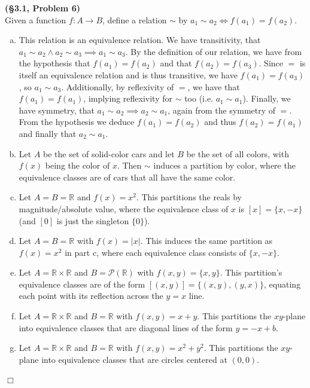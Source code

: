 \documentclass[12pt]{article}
\theoremstyle{definition}
\newenvironment{Solution}{\noindent {\sc Solution.}}{$\Box$ \vspace{2 ex}}
\begin{document}
\vspace{0.5cm}

\begin{Solution}
{\bf (\S3.1, Problem 6)}\\
Given a function $f : A \to B$, define a relation $\sim$ by $a_1 \sim a_2 \iff f(a_1) = f(a_2)$.
\begin{enumerate}[(a)]
    \item This relation is an equivalence relation. We have transitivity, that $a_1 \sim a_2 \land a_2 \sim a_3 \implies a_1\sim a_3$. By the definition of our relation, we have from the hypothesis that $f(a_1) = f(a_2)$ and that $f(a_2) = f(a_3)$. Since $=$ is itself an equivalence relation and is thus transitive, we have $f(a_1)=f(a_3)$, so $a_1 \sim a_3$. Additionally, by reflexivity of $=$, we have that $f(a_1) = f(a_1)$, implying reflexivity for $\sim$ too (i.e. $a_1 \sim a_1$). Finally, we have symmetry, that $a_1 \sim a_2 \implies a_2 \sim a_1$, again from the symmetry of $=$. From the hypothesis we deduce $f(a_1)=f(a_2)$ and thus $f(a_2) = f(a_1)$ and finally that $a_2 \sim a_1$.
    \item Let $A$ be the set of solid-color cars and let $B$ be the set of all colors, with $f(x)$ being the color of $x$. Then $\sim$ induces a partition by color, where the equivalence classes are of cars that all have the same color.
    \item Let $A=B=\mathbb R$ and $f(x)=x^2$. This partitions the reals by magnitude/absolute value, where the equivalence class of $x$ is $[x]=\{x,-x\}$ (and $[0]$ is just the singleton $\{0\}$).
    \item Let $A=B=\mathbb R$ with $f(x)=|x|$. This induces the same partition as $f(x)=x^2$ in part c, where each equivalence class consists of $\{x, -x\}$.
    \item Let $A=\mathbb R \times \mathbb R$ and $B=\mathcal P(\mathbb R)$ with $f(x,y)=\{x,y\}$. This partition's equivalence classes are of the form $[(x,y)]=\{(x,y),(y,x)\}$, equating each point with its reflection across the $y=x$ line.
    \item Let $A=\mathbb R \times \mathbb R$ and $B = \mathbb R$ with $f(x,y) = x+y$. This partitions the $xy$-plane into equivalence classes that are diagonal lines of the form $y = -x+b$.
    \item Let $A=\mathbb R \times \mathbb R$ and $B = \mathbb R$ with $f(x,y)=x^2+y^2$. This partitions the $xy$-plane into equivalence classes that are circles centered at $(0,0)$.
\end{enumerate}
\end{Solution}
\end{document}
